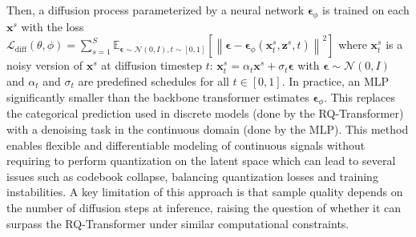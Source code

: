 Then, a diffusion process parameterized by a neural network \( \bm{\epsilon}_\phi \) is trained on each \( \mathbf{x}^s \) with the loss $\mathcal{L}_{\text{diff}}(\theta, \phi) = \sum_{s=1}^S\mathbb{E}_{\bm{\epsilon} \sim \mathcal{N}(0, I), t \sim [0, 1]} \left[ \left\| \bm{\epsilon} - \bm{\epsilon}_\phi(\mathbf{x}_t^s, \mathbf{z}^s, t ) \right\|^2 \right]$
where \( \mathbf{x}^s_t \) is a noisy version of \( \mathbf{x}^s \) at diffusion timestep \( t \): $\mathbf{x}_t^s = \alpha_t\mathbf{x}^s + \sigma_t \bm{\epsilon}$ with $\bm{\epsilon} \sim \mathcal{N}(0, I)$ and $\alpha_t$ and $\sigma_t$ are predefined schedules for all $t \in [0, 1]$. In practice, an MLP significantly smaller than the backbone transformer estimates $\bm{\epsilon}_\phi$. 
This replaces the categorical prediction used in discrete models (done by the RQ-Transformer) with a denoising task in the continuous domain (done by the MLP). This method enables flexible and differentiable modeling of continuous signals without requiring to perform quantization on the latent space which can lead to several issues such as codebook collapse, balancing quantization losses and training instabilities. 
A key limitation of this approach is that sample quality depends on the number of diffusion steps at inference, raising the question of whether it can surpass the RQ-Transformer under similar computational constraints.
